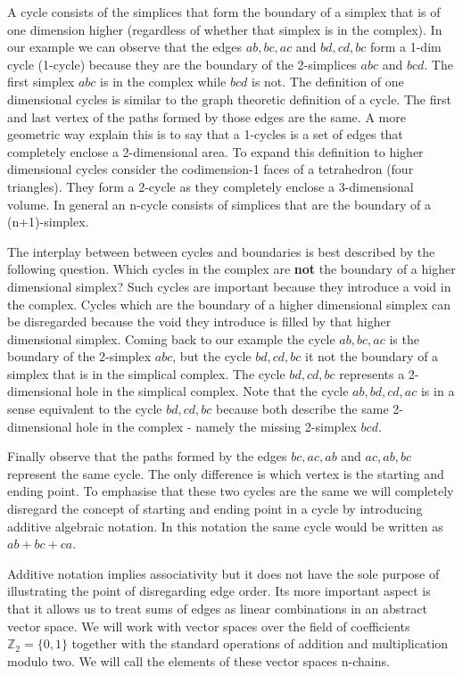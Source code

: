 A cycle consists of the simplices that form the boundary of a simplex that is of one dimension higher (regardless of whether that simplex is in the complex). In our example we can observe that the edges $ab, bc, ac$ and $bd, cd, bc$ form a 1-dim cycle (1-cycle) because they are the boundary of the 2-simplices $abc$ and $bcd$. The first simplex $abc$ is in the complex while $bcd$ is not. The definition of one dimensional cycles is similar to the graph theoretic definition of a cycle. The first and last vertex of the paths formed by those edges are the same. A more geometric way explain this is to say that a 1-cycles is a set of edges that completely enclose a 2-dimensional area. To expand this definition to higher dimensional cycles consider the codimension-1 faces of a tetrahedron (four triangles). They form a 2-cycle as they completely enclose a 3-dimensional volume. In general an n-cycle consists of simplices that are the boundary of a (n+1)-simplex.

The interplay between between cycles and boundaries is best described by the following question. Which cycles in the complex are \textbf{not} the boundary of a higher dimensional simplex? Such cycles are important because they introduce a void in the complex. Cycles which are the boundary of a higher dimensional simplex can be disregarded because the void they introduce is filled by that higher dimensional simplex. Coming back to our example the cycle $ab, bc, ac$ is the boundary of the 2-simplex $abc$, but the cycle $bd, cd, bc$ it not the boundary of a simplex that is in the simplical complex. The cycle $bd, cd, bc$ represents a 2-dimensional hole in the simplical complex. Note that the cycle $ab, bd, cd, ac$ is in a sense equivalent to the cycle $bd, cd, bc$ because both describe the same 2-dimensional hole in the complex - namely the missing 2-simplex $bcd$.

Finally observe that the paths formed by the edges $bc, ac, ab$ and $ac, ab, bc$ represent the same cycle. The only difference is which vertex is the starting and ending point. To emphasise that these two cycles are the same we will completely disregard the concept of starting and ending point in a cycle by introducing additive algebraic notation. In this notation the same cycle would be written as $ab + bc + ca$.

Additive notation implies associativity but it does not have the sole purpose of illustrating the point of disregarding edge order. Its more important aspect is that it allows us to treat sums of edges as linear combinations in an abstract vector space. We will work with vector spaces over the field of coefficients $\mathbb{Z}_2 = \{0, 1\}$ together with the standard operations of addition and multiplication modulo two. We will call the elements of these vector spaces n-chains.

